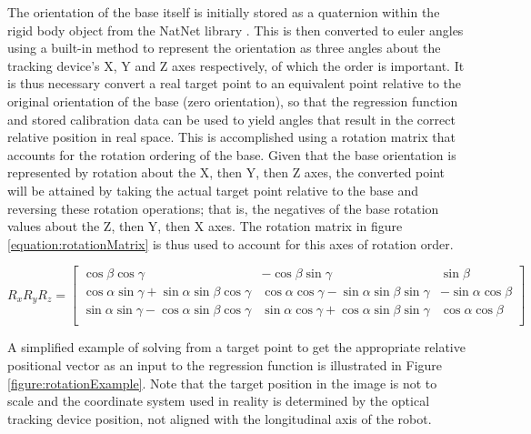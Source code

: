 \documentclass[11pt]{article}
\begin{document}
The orientation of the base itself is initially stored as a quaternion within the rigid body object from the NatNet library \cite{natnet2016}. This is then converted to euler angles using a built-in method to represent the orientation as three angles about the tracking device's X, Y and Z axes respectively, of which the order is important. It is thus necessary convert a real target point to an equivalent point relative to the original orientation of the base (zero orientation), so that the regression function and stored calibration data can be used to yield angles that result in the correct relative position in real space. This is accomplished using a rotation matrix that accounts for the rotation ordering of the base. Given that the base orientation is represented by rotation about the X, then Y, then Z axes, the converted point will be attained by taking the actual target point relative to the base and reversing these rotation operations; that is, the negatives of the base rotation values about the Z, then Y, then X axes. The rotation matrix in figure \ref{equation:rotationMatrix} is thus used to account for this axes of rotation order. 

\begin{center}
\[
R_{x}R_{y}R_{z} = 
\begin{bmatrix*}
\cos\beta\cos\gamma & -\cos\beta\sin\gamma & \sin\beta \\
\cos\alpha\sin\gamma + \sin\alpha\sin\beta\cos\gamma & \cos\alpha\cos\gamma - \sin\alpha\sin\beta\sin\gamma & -\sin\alpha\cos\beta \\
\sin\alpha\sin\gamma - \cos\alpha\sin\beta\cos\gamma & \sin\alpha\cos\gamma + \cos\alpha\sin\beta\sin\gamma & \cos\alpha\cos\beta \\
\end{bmatrix*}
\]
\label{equation:rotationMatrix}
\end{center}

A simplified example of solving from a target point to get the appropriate relative positional vector as an input to the regression function is illustrated in Figure \ref{figure:rotationExample}. Note that the target position in the image is not to scale and the coordinate system used in reality is determined by the optical tracking device position, not aligned with the longitudinal axis of the robot. 
\end{document}
